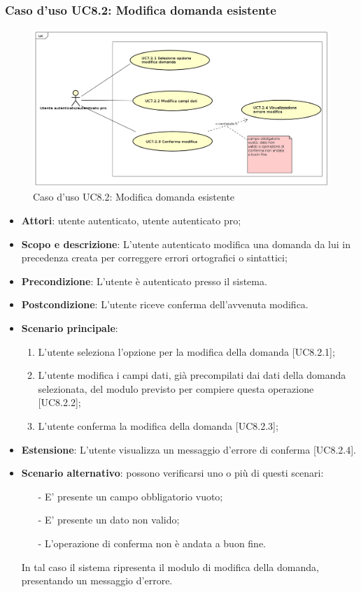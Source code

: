 	\subsubsection{Caso d'uso UC8.2: Modifica domanda esistente}
	\label{UC8.2}
	\begin{figure}[h]
		\centering
			\includegraphics[scale=0.45,keepaspectratio]{UML/UC8_2.png}
		\caption{Caso d'uso UC8.2: Modifica domanda esistente}
	\end{figure}
	\FloatBarrier
	\begin{itemize}
		\item
			\textbf{Attori}: utente autenticato, utente autenticato pro;
		\item		
			\textbf{Scopo e descrizione}: L'utente autenticato modifica una domanda da lui in precedenza creata per correggere errori ortografici o sintattici;
		\item
			\textbf{Precondizione}: L'utente è autenticato presso il sistema. 
		\item
			\textbf{	Postcondizione}: L'utente riceve conferma dell'avvenuta modifica.
		\item
			\textbf{Scenario principale}:
	       		\begin{enumerate}
					\item 	
					L'utente seleziona l'opzione per la modifica della domanda [UC8.2.1];
					\item
					L'utente modifica i campi dati, già precompilati dai dati della domanda selezionata, del modulo previsto per compiere questa operazione [UC8.2.2];
					\item
					L'utente conferma la modifica della domanda [UC8.2.3];
	 			\end{enumerate}
	 	\item
			\textbf{Estensione}: L'utente visualizza un messaggio d'errore di conferma [UC8.2.4].
	 	\item
	 		\textbf{Scenario alternativo}: possono verificarsi uno o più di questi scenari:
				\begin{itemize}
					\item[-] 	
						E' presente un campo obbligatorio vuoto;
					\item[-] 
    						E' presente  un dato non valido;
					\item[-] 
						L'operazione di conferma non è andata a buon fine.
				\end{itemize}
			In tal caso il sistema ripresenta il modulo di modifica della domanda, presentando un messaggio d'errore.
	\end{itemize}
